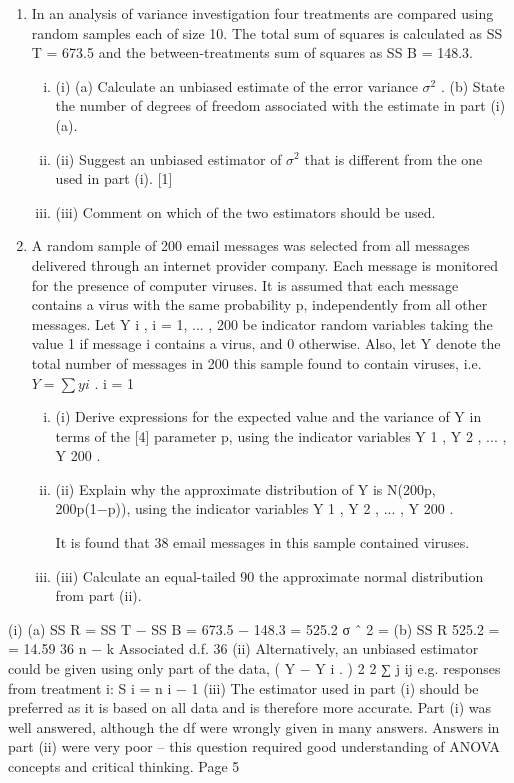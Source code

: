 \documentclass[a4paper,12pt]{article}
\begin{document}
\begin{enumerate}

\item In an analysis of variance investigation four treatments are compared using random
samples each of size 10. The total sum of squares is calculated as SS T = 673.5 and the
between-treatments sum of squares as SS B = 148.3.
\begin{enumerate}[(i)]
\item (i)
(a) Calculate an unbiased estimate of the error variance $\sigma^2$ .
(b) State the number of degrees of freedom associated with the estimate in
part (i)(a).

\item (ii) Suggest an unbiased estimator of $\sigma^2$ that is different from the one used in part
(i).
[1]
\item (iii) Comment on which of the two estimators should be used.
\end{enumerate}

\item %
A random sample of 200 email messages was selected from all messages delivered
through an internet provider company. Each message is monitored for the presence of
computer viruses. It is assumed that each message contains a virus with the same
probability p, independently from all other messages.
Let Y i , i = 1, ... , 200 be indicator random variables taking the value 1 if message i
contains a virus, and 0 otherwise. Also, let Y denote the total number of messages in
200
this sample found to contain viruses, i.e. $Y = \sum y i$ .
i = 1
\begin{enumerate}[(i)]
    \item (i) Derive expressions for the expected value and the variance of Y in terms of the
[4]
parameter p, using the indicator variables Y 1 , Y 2 , ... , Y 200 .
\item (ii) Explain why the approximate distribution of Y is N(200p, 200p(1−p)), using
the indicator variables Y 1 , Y 2 , ... , Y 200 .

It is found that 38 email messages in this sample contained viruses.
\item (iii)
Calculate an equal-tailed 90%
the approximate normal distribution from part (ii).
\end{enumerate}


\end{enumerate}
(i)
(a) SS R = SS T − SS B = 673.5 − 148.3 = 525.2
σ ˆ 2 =
(b)
SS R 525.2
=
= 14.59
36
n − k
Associated d.f. 36
(ii) Alternatively, an unbiased estimator could be given using only part of the data,
( Y − Y i . ) 2
2 ∑ j ij
e.g. responses from treatment i: S i =
n i − 1
(iii) The estimator used in part (i) should be preferred as it is based on all data and
is therefore more accurate.
Part (i) was well answered, although the df were wrongly given in many answers. Answers in
part (ii) were very poor – this question required good understanding of ANOVA concepts and
critical thinking.
Page 5%
\end{document}
